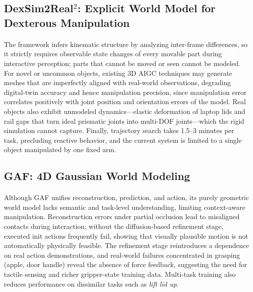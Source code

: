 \documentclass[12pt,a4paper,final]{extreport}
\begin{document}
\subsection{DexSim2Real$^2$: Explicit World Model for Dexterous Manipulation}

\paragraph{} The framework infers kinematic structure by analyzing inter-frame differences, so it strictly requires observable state changes of every movable part during interactive perception; parts that cannot be moved or seen cannot be modeled. For novel or uncommon objects, existing 3D AIGC techniques may generate meshes that are imperfectly aligned with real-world observations, degrading digital-twin accuracy and hence manipulation precision, since manipulation error correlates positively with joint position and orientation errors of the model. Real objects also exhibit unmodeled dynamics---elastic deformation of laptop lids and rail gaps that turn ideal prismatic joints into multi-DOF joints---which the rigid simulation cannot capture. Finally, trajectory search takes 1.5--3 minutes per task, precluding reactive behavior, and the current system is limited to a single object manipulated by one fixed arm.

\subsection{GAF: 4D Gaussian World Modeling}

\paragraph{} Although GAF unifies reconstruction, prediction, and action, its purely geometric world model lacks semantic and task-level understanding, limiting context-aware manipulation. Reconstruction errors under partial occlusion lead to misaligned contacts during interaction; without the diffusion-based refinement stage, executed init actions frequently fail, showing that visually plausible motion is not automatically physically feasible. The refinement stage reintroduces a dependence on real action demonstrations, and real-world failures concentrated in grasping (apple, door handle) reveal the absence of force feedback, suggesting the need for tactile sensing and richer gripper-state training data. Multi-task training also reduces performance on dissimilar tasks such as \emph{lift lid up}.
\end{document}
